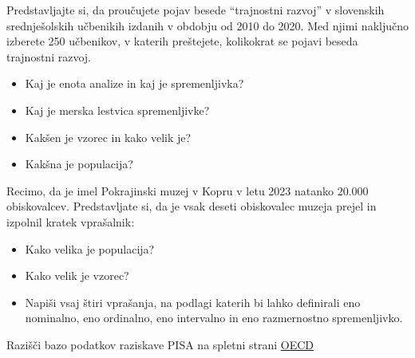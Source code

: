 \begin{Vaje}{3}
        Predstavljajte si, da proučujete pojav besede “trajnostni razvoj” v slovenskih srednješolskih učbenikih izdanih v obdobju od 2010 do 2020. Med njimi naključno izberete 250 učbenikov, v katerih preštejete, kolikokrat se pojavi beseda trajnostni razvoj.
        \begin{itemize}
            \item Kaj je enota analize in kaj je spremenljivka?
            \item Kaj je merska lestvica spremenljivke?
            \item Kakšen je vzorec in kako velik je?
            \item Kakšna je populacija?
        \end{itemize}
\end{Vaje}

\begin{Vaje}{4}
        Recimo, da je imel Pokrajinski muzej v Kopru v letu 2023 natanko 20.000 obiskovalcev. Predstavljate si, da je vsak deseti obiskovalec muzeja prejel in izpolnil kratek vprašalnik:
        \begin{itemize}
            \item Kako velika je populacija?
            \item Kako velik je vzorec?
            \item Napiši vsaj štiri vprašanja, na podlagi katerih bi lahko definirali eno nominalno, eno ordinalno, eno intervalno in eno razmernostno spremenljivko. 
        \end{itemize}
\end{Vaje}

\begin{Vaje}{4}
        Razišči bazo podatkov raziskave PISA na spletni strani \href{https://www.oecd.org/pisa/data/2022database/}{OECD}
\end{Vaje}